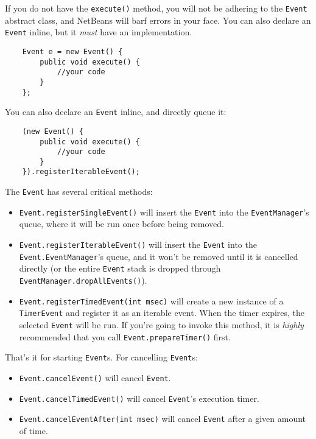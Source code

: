 \documentclass[a4paper]{article}
\begin{document}
If you do not have the \lstinline{execute()} method, you will not be adhering to the \lstinline{Event} abstract class, and NetBeans will barf errors in your face. You can also declare an \lstinline{Event} inline, but it \textit{must} have an implementation.

\begin{lstlisting}
	Event e = new Event() {
		public void execute() {
			//your code
		}
	};
\end{lstlisting}

You can also declare an \lstinline{Event} inline, and directly queue it:

\begin{lstlisting}
	(new Event() {
		public void execute() {
			//your code
		}
	}).registerIterableEvent();
\end{lstlisting}

The \lstinline{Event} has several critical methods:
\begin{itemize}\item{\lstinline{Event.registerSingleEvent()} will insert the \lstinline{Event} into the \lstinline{EventManager}'s queue, where it will be run once before being removed.}\item{\lstinline{Event.registerIterableEvent()} will insert the \lstinline{Event} into the \lstinline{Event.EventManager}'s queue, and it won't be removed until it is cancelled directly (or the entire \lstinline{Event} stack is dropped through \lstinline{EventManager.dropAllEvents()}).}\item{\lstinline{Event.registerTimedEvent(int msec)} will create a new instance of a \lstinline{TimerEvent} and register it as an iterable event. When the timer expires, the selected \lstinline{Event} will be run. If you're going to invoke this method, it is \textit{highly} recommended that you call \lstinline{Event.prepareTimer()} first.}\end{itemize}

That's it for starting \lstinline{Event}s. For cancelling \lstinline{Event}s: \begin{itemize}\item{\lstinline{Event.cancelEvent()} will cancel \lstinline{Event}.}\item{\lstinline{Event.cancelTimedEvent()} will cancel \lstinline{Event}'s execution timer.}\item{\lstinline{Event.cancelEventAfter(int msec)} will cancel \lstinline{Event} after a given amount of time.}\end{itemize}
\end{document}
